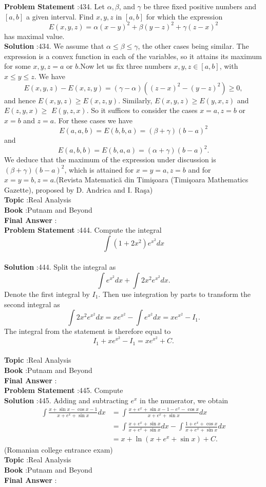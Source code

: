 \documentclass[10pt]{article}
\begin{document}
\textbf{Problem Statement} :434. Let $\alpha, \beta$, and $\gamma$ be three fixed positive numbers and $[a, b]$ a given interval. Find $x, y, z$ in $[a, b]$ for which the expression$$ E(x, y, z)=\alpha(x-y)^{2}+\beta(y-z)^{2}+\gamma(z-x)^{2} $$has maximal value.\\
\textbf{Solution} :434. We assume that $\alpha \leq \beta \leq \gamma$, the other cases being similar. The expression is a convex function in each of the variables, so it attains its maximum for some $x, y, z=a$ or $b$.Now let us fix three numbers $x, y, z \in[a, b]$, with $x \leq y \leq z$. We have$$ E(x, y, z)-E(x, z, y)=(\gamma-\alpha)\left((z-x)^{2}-(y-z)^{2}\right) \geq 0, $$and hence $E(x, y, z) \geq E(x, z, y)$. Similarly, $E(x, y, z) \geq E(y, x, z)$ and $E(z, y, x) \geq$ $E(y, z, x)$. So it suffices to consider the cases $x=a, z=b$ or $x=b$ and $z=a$. For these cases we have$$ E(a, a, b)=E(b, b, a)=(\beta+\gamma)(b-a)^{2} $$and$$ E(a, b, b)=E(b, a, a)=(\alpha+\gamma)(b-a)^{2} . $$We deduce that the maximum of the expression under discussion is $(\beta+\gamma)(b-a)^{2}$, which is attained for $x=y=a, z=b$ and for $x=y=b, z=a$.(Revista Matematică din Timişoara (Timişoara Mathematics Gazette), proposed by D. Andrica and I. Raşa)\\
\textbf{Topic} :Real Analysis\\
\textbf{Book} :Putnam and Beyond\\
\textbf{Final Answer} :\\


\textbf{Problem Statement} :444. Compute the integral$$ \int\left(1+2 x^{2}\right) e^{x^{2}} d x $$\\
\textbf{Solution} :444. Split the integral as$$ \int e^{x^{2}} d x+\int 2 x^{2} e^{x^{2}} d x . $$Denote the first integral by $I_{1}$. Then use integration by parts to transform the second integral as$$ \int 2 x^{2} e^{x^{2}} d x=x e^{x^{2}}-\int e^{x^{2}} d x=x e^{x^{2}}-I_{1} . $$The integral from the statement is therefore equal to$$ I_{1}+x e^{x^{2}}-I_{1}=x e^{x^{2}}+C . $$\\
\textbf{Topic} :Real Analysis\\
\textbf{Book} :Putnam and Beyond\\
\textbf{Final Answer} :\\


\textbf{Problem Statement} :445. Compute\\
\textbf{Solution} :445. Adding and subtracting $e^{x}$ in the numerator, we obtain$$ \begin{aligned} \int \frac{x+\sin x-\cos x-1}{x+e^{x}+\sin x} d x &=\int \frac{x+e^{x}+\sin x-1-e^{x}-\cos x}{x+e^{x}+\sin x} d x \\ &=\int \frac{x+e^{x}+\sin x}{x+e^{x}+\sin x} d x-\int \frac{1+e^{x}+\cos x}{x+e^{x}+\sin x} d x \\ &=x+\ln \left(x+e^{x}+\sin x\right)+C . \end{aligned} $$(Romanian college entrance exam)\\
\textbf{Topic} :Real Analysis\\
\textbf{Book} :Putnam and Beyond\\
\textbf{Final Answer} :\\
\end{document}
